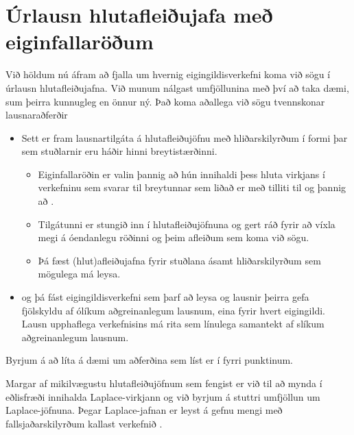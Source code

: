 \documentclass[a4paper,10pt,icelandic]{sphinxmanual}
\begin{document}
\section{Úrlausn hlutafleiðujafa með eiginfallaröðum}
\label{\detokenize{Kafli03:urlausn-hlutafleiujafa-me-eiginfallaroum}}
Við höldum nú áfram að fjalla um hvernig eigingildisverkefni koma við sögu í úrlausn hlutafleiðujafna. Við munum nálgast umfjöllunina með því að taka dæmi, sum þeirra kunnugleg en önnur ný. Það koma aðallega við sögu tvennskonar lausnaraðferðir
\begin{itemize}
\item {} 
Sett er fram lausnartilgáta á hlutafleiðujöfnu með hliðarskilyrðum í formi  þar sem stuðlarnir eru háðir hinni breytistærðinni.
\begin{itemize}
\item {} 
Eiginfallaröðin er valin þannig að hún innihaldi  þess hluta virkjans í verkefninu sem svarar til breytunnar sem liðað er með tilliti til og þannig að .

\item {} 
Tilgátunni er stungið inn í hlutafleiðujöfnuna og gert ráð fyrir að víxla megi á óendanlegu röðinni og þeim afleiðum sem koma við sögu.

\item {} 
Þá fæst (hlut)afleiðujafna fyrir stuðlana ásamt hliðarskilyrðum sem mögulega má leysa.

\end{itemize}

\item {} 
 og þá fást eigingildisverkefni sem þarf að leysa og lausnir þeirra gefa fjölskyldu af ólíkum aðgreinanlegum lausnum, eina fyrir hvert eigingildi.  Lausn upphaflega verkefnisins má rita sem línulega samantekt af slíkum aðgreinanlegum lausnum.

\end{itemize}

Byrjum á að líta á dæmi um aðferðina sem líst er í fyrri punktinum.

Margar af mikilvægustu hlutafleiðujöfnum sem fengist er við til að mynda í eðlisfræði innihalda Laplace-virkjann og við byrjum á stuttri umfjöllun um Laplace-jöfnuna. Þegar Laplace-jafnan er leyst á gefnu mengi með fallsjaðarskilyrðum kallast verkefnið .
\end{document}
